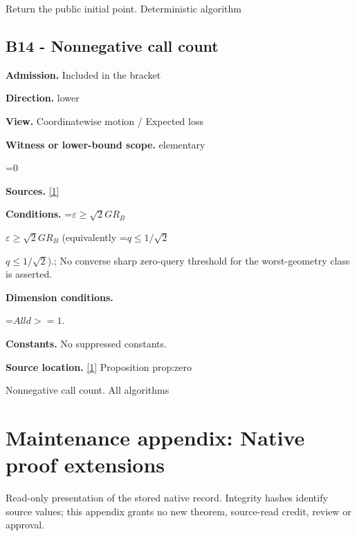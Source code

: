 \documentclass[10pt,a4paper]{article}
\newcommand{\AtlasMath}[1]{\par\begingroup\centering\setbox0=\hbox{$\displaystyle #1$}\ifdim\wd0>1.4\linewidth\typeout{ATLAS WIDE FORMULA: \the\wd0}\fi\ifdim\wd0>\linewidth\resizebox{\linewidth}{!}{\box0}\else\box0\fi\par\endgroup}
\newcommand{\AtlasInlineMath}[1]{\begingroup\setbox0=\hbox{$#1$}\ifdim\wd0>.4\linewidth\endgroup\AtlasMath{#1}\else\endgroup$#1$\fi}
\begin{document}
Return the public initial point. Deterministic algorithm



\subsection{B14 - Nonnegative call count}


\textbf{Admission.} Included in the bracket



\textbf{Direction.} lower



\textbf{View.} Coordinatewise motion / Expected loss



\textbf{Witness or lower-bound scope.} elementary



\AtlasMath{0}


\textbf{Sources.} \href{https://github.com/WU-Wendao/Colombo/blob/main/colombo_sensorium/Complexity_altas/data/sources/colombo/U03/manuscript.pdf}{[1]}



\textbf{Conditions.} \AtlasInlineMath{\varepsilon\ge\sqrt2GR_B} (equivalently \AtlasInlineMath{q\le1/\sqrt2}).; No converse sharp zero-query threshold for the worst-geometry class is asserted.



\textbf{Dimension conditions.}



\AtlasMath{All d>=1.}


\textbf{Constants.} No suppressed constants.



\textbf{Source location.} \href{https://github.com/WU-Wendao/Colombo/blob/main/colombo_sensorium/Complexity_altas/data/sources/colombo/U03/manuscript.pdf}{[1]} Proposition prop:zero



Nonnegative call count. All algorithms



\section{Maintenance appendix: Native proof extensions}


Read-only presentation of the stored native record. Integrity hashes identify source values; this appendix grants no new theorem, source-read credit, review or approval.
\end{document}
